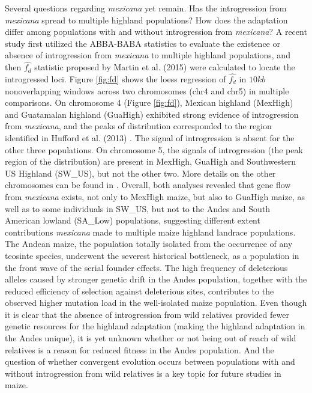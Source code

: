 \documentclass[11pt]{article}
\begin{document}
Several questions regarding \emph{mexicana} yet remain.
Has the introgression from \emph{mexicana} spread to multiple highland populations? 
How does the adaptation differ among populations with and without introgression from \emph{mexicana}?
A recent study \cite{Wang2015manuscript} first utilized the ABBA-BABA statistics to evaluate the existence or absence of introgression from \emph{mexicana} to multiple highland populations, and then $\hat{f_{d}}$ statistic proposed by Martin et al. (2015) \citep{martin2015} were calculated to locate the introgressed loci. 
Figure \ref{fig:fd} shows the loess regression of $\hat{f_{d}}$ in $10kb$ non\-overlapping windows across two chromosomes (chr4 and chr5) in multiple comparisons. 
On chromosome 4 (Figure \ref{fig:fd}), Mexican highland (MexHigh) and Guatamalan highland (GuaHigh) exhibited strong evidence of introgression from \emph{mexicana}, and the peaks of distribution corresponded to the region identified in Hufford et al. (2013) \citep{hufford2013}. 
The signal of introgression is absent for the other three populations.
On chromosome 5, the signals of introgression (the peak region of the distribution) are present in MexHigh, GuaHigh and Southwestern US Highland (SW\_US), but not the other two.
More details on the other chromosomes can be found in \cite{Wang2015manuscript}.
Overall, both analyses revealed that gene flow from \emph{mexicana} exists, not only to MexHigh maize, but also to GuaHigh maize, as well as to some individuals in SW\_US, but not to the Andes and South American lowland (SA\_Low) populations, suggesting different extent contributions \emph{mexicana} made to multiple maize highland landrace populations. 
The Andean maize, the population totally isolated from the occurrence of any teosinte species, underwent the severest historical bottleneck, as a population in the front wave of the serial founder effects. 
The high frequency of deleterious alleles caused by stronger genetic drift in the Andes population, together with the reduced efficiency of selection against deleterious sites, contributes to the observed higher mutation load in the well-isolated maize population.
Even though it is clear that the absence of introgression from wild relatives provided fewer genetic resources for the highland adaptation (making the highland adaptation in the Andes unique), it is yet unknown whether or not being out of reach of wild relatives is a reason for reduced fitness in the Andes population.
And the question of whether convergent evolution occurs between populations with and without introgression from wild relatives is a key topic for future studies in maize.
\end{document}
